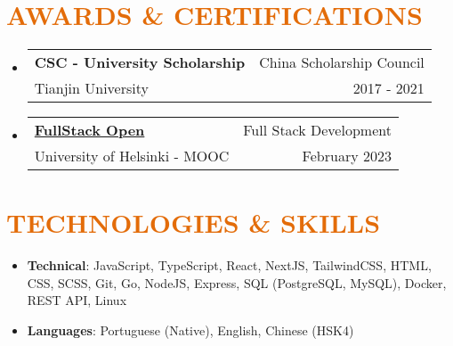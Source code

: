 \documentclass[a4paper, 20pt]{article}
\makeatletter
\newcommand{\resumeItem}[2]{
  \item\small{
    \textbf{#1}{: #2 \vspace{-2pt}}
  }
}
\newcommand{\resumeSubheading}[4]{
  \vspace{-1pt}\item
    \begin{tabular*}{0.97\textwidth}{l@{\extracolsep{\fill}}r}
      \textbf{#1} & #2 \\
      #3 & #4 \\
    \end{tabular*}\vspace{-5pt}
}
\newcommand{\resumeSubItem}[2]{\resumeItem{#1}{#2}\vspace{-3pt}}
\newcommand{\resumeSubHeadingListStart}{\begin{itemize}[leftmargin=*]}
\newcommand{\resumeSubHeadingListEnd}{\end{itemize}}
\makeatother
\begin{document}
\begin{CJK*}{UTF8}{gbsn}
\vspace{5pt}
\section{\textcolor[HTML]{E36C09}{\textbf{AWARDS \& CERTIFICATIONS}}}
\resumeSubHeadingListStart{}
\resumeSubheading{CSC - University Scholarship}{China Scholarship Council}
{Tianjin University}{2017 - 2021}
\resumeSubheading{\href{https://studies.cs.helsinki.fi/stats/api/certificate/fullstackopen/en/c54941f0ecb4d052a3cf6982d1d27398}{FullStack Open}}{Full Stack Development}
{University of Helsinki - MOOC}{February 2023}
\resumeSubHeadingListEnd{}

\vspace{5pt}
\section{\textcolor[HTML]{E36C09}{\textbf{TECHNOLOGIES \& SKILLS}}}
\resumeSubHeadingListStart{}
	  \resumeSubItem{Technical}{\quad JavaScript, TypeScript, React, NextJS, TailwindCSS, HTML, CSS, SCSS, Git, Go, NodeJS, Express, SQL (PostgreSQL, MySQL), Docker, REST API, Linux}
	  \resumeSubItem{Languages}{\quad Portuguese (Native), English, Chinese (HSK4)}
    \resumeSubHeadingListEnd{}


\vspace{5pt}

\end{CJK*}
\end{document}
